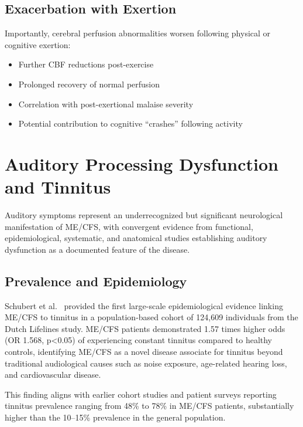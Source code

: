 \subsection{Exacerbation with Exertion}

Importantly, cerebral perfusion abnormalities worsen following physical or cognitive exertion:

\begin{itemize}
    \item Further CBF reductions post-exercise
    \item Prolonged recovery of normal perfusion
    \item Correlation with post-exertional malaise severity
    \item Potential contribution to cognitive ``crashes'' following activity
\end{itemize}

\section{Auditory Processing Dysfunction and Tinnitus}
\label{sec:auditory-dysfunction}

Auditory symptoms represent an underrecognized but significant neurological manifestation of ME/CFS, with convergent evidence from functional, epidemiological, systematic, and anatomical studies establishing auditory dysfunction as a documented feature of the disease.

\subsection{Prevalence and Epidemiology}

\begin{achievement}
\label{ach:schubert2021-tinnitus}
Schubert et al.~\cite{Schubert2021} provided the first large-scale epidemiological evidence linking ME/CFS to tinnitus in a population-based cohort of 124,609 individuals from the Dutch Lifelines study. ME/CFS patients demonstrated 1.57 times higher odds (OR 1.568, p<0.05) of experiencing constant tinnitus compared to healthy controls, identifying ME/CFS as a novel disease associate for tinnitus beyond traditional audiological causes such as noise exposure, age-related hearing loss, and cardiovascular disease.
\end{achievement}

This finding aligns with earlier cohort studies and patient surveys reporting tinnitus prevalence ranging from 48\% to 78\% in ME/CFS patients, substantially higher than the 10--15\% prevalence in the general population.

